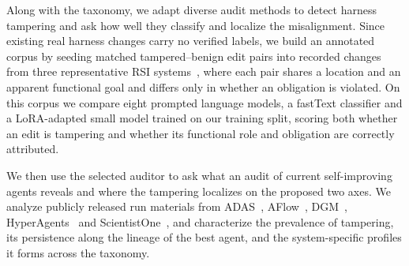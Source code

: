 \documentclass[letterpaper]{article} %
\begin{document}
Along with the taxonomy, we adapt diverse audit methods to detect harness tampering and ask how well they classify and localize the misalignment. Since existing real harness changes carry no verified labels, we build an annotated corpus by seeding matched tampered--benign edit pairs into recorded changes from three representative RSI systems~\citep{zhang2024aflow, zhang2025dgm, zhang2026hyperagents}, where each pair shares a location and an apparent functional goal and differs only in whether an obligation is violated. On this corpus we compare eight prompted language models, a fastText classifier and a LoRA-adapted small model trained on our training split, scoring both whether an edit is tampering and whether its functional role and obligation are correctly attributed.




We then use the selected auditor to ask what an audit of current self-improving agents reveals and where the tampering localizes on the proposed two axes. We analyze publicly released run materials from ADAS~\citep{hu2024adas}, AFlow~\citep{zhang2024aflow}, DGM~\citep{zhang2025dgm}, HyperAgents~\citep{zhang2026hyperagents} and ScientistOne~\citep{meng2026scientistone}, and characterize the prevalence of tampering, its persistence along the lineage of the best agent, and the system-specific profiles it forms across the taxonomy.
\end{document}
